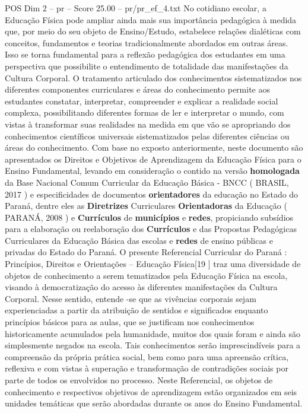 \begin{textsample}{POS Dim 2 – pr – Score 25.00 – pr/pr\_ef\_4.txt}
No cotidiano escolar, a Educação Física pode ampliar ainda mais sua importância pedagógica à medida que, por meio do seu objeto de Ensino/Estudo, estabelece relações dialéticas com conceitos, fundamentos e teorias tradicionalmente abordados em outras áreas.
Isso se torna fundamental para a reflexão pedagógica dos estudantes em uma perspectiva que possibilite o entendimento de totalidade das manifestações da Cultura Corporal.
O tratamento articulado dos conhecimentos sistematizados nos diferentes componentes curriculares e áreas do conhecimento permite aos estudantes constatar, interpretar, compreender e explicar a realidade social complexa, possibilitando diferentes formas de ler e interpretar o mundo, com vistas à transformar suas realidades na medida em que vão se apropriando dos conhecimentos científicos universais sistematizados pelas diferentes ciências ou áreas do conhecimento.
Com base no exposto anteriormente, neste documento são apresentados os Direitos e Objetivos de Aprendizagem da Educação Física para o Ensino Fundamental, levando em consideração o contido na versão \textbf{homologada} da Base Nacional Comum Curricular da Educação Básica - BNCC ( BRASIL, 2017 ) e especificidades de documentos \textbf{orientadores} da educação no Estado do Paraná, dentre eles as \textbf{Diretrizes} Curriculares \textbf{Orientadoras} da Educação ( PARANÁ, 2008 ) e \textbf{Currículos} de \textbf{municípios} e \textbf{redes}, propiciando subsídios para a elaboração ou reelaboração dos \textbf{Currículos} e das Propostas Pedagógicas Curriculares da Educação Básica das escolas e \textbf{redes} de ensino públicas e privadas do Estado do Paraná.
O presente Referencial Curricular do Paraná : Princípios, Direitos e Orientações – Educação Física[19 ] traz uma diversidade de objetos de conhecimento a serem tematizados pela Educação Física na escola, visando à democratização do acesso às diferentes manifestações da Cultura Corporal.
Nesse sentido, entende -se que as vivências corporais sejam experienciadas a partir da atribuição de sentidos e significados enquanto princípios básicos para as aulas, que se justificam nos conhecimentos historicamente acumulados pela humanidade, muitos dos quais foram e ainda são simplesmente negados na escola.
Tais conhecimentos serão imprescindíveis para a compreensão da própria prática social, bem como para uma apreensão crítica, reflexiva e com vistas à superação e transformação de contradições sociais por parte de todos os envolvidos no processo.
Neste Referencial, os objetos de conhecimento e respectivos objetivos de aprendizagem estão organizados em seis unidades temáticas que serão abordadas durante os anos do Ensino Fundamental.

\end{textsample}
